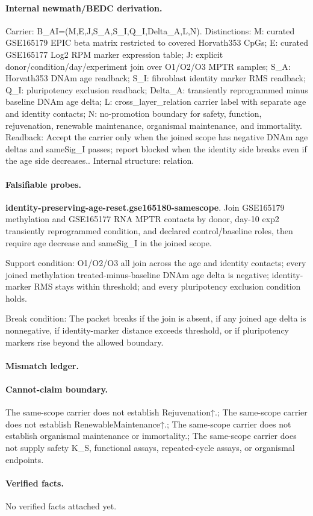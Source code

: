 \paragraph{Internal newmath/BEDC derivation.} Carrier: B\_AI=(M,E,J,S\_A,S\_I,Q\_I,Delta\_A,L,N). Distinctions: M: curated GSE165179 EPIC beta matrix restricted to covered Horvath353 CpGs; E: curated GSE165177 Log2 RPM marker expression table; J: explicit donor/condition/day/experiment join over O1/O2/O3 MPTR samples; S\_A: Horvath353 DNAm age readback; S\_I: fibroblast identity marker RMS readback; Q\_I: pluripotency exclusion readback; Delta\_A: transiently reprogrammed minus baseline DNAm age delta; L: cross\_layer\_relation carrier label with separate age and identity contacts; N: no-promotion boundary for safety, function, rejuvenation, renewable maintenance, organismal maintenance, and immortality. Readback: Accept the carrier only when the joined scope has negative DNAm age deltas and sameSig\_I passes; report blocked when the identity side breaks even if the age side decreases.. Internal structure: relation.

\paragraph{Falsifiable probes.}
\textbf{identity-preserving-age-reset.gse165180-samescope}. Join GSE165179 methylation and GSE165177 RNA MPTR contacts by donor, day-10 exp2 transiently reprogrammed condition, and declared control/baseline roles, then require age decrease and sameSig\_I in the joined scope.

Support condition: O1/O2/O3 all join across the age and identity contacts; every joined methylation treated-minus-baseline DNAm age delta is negative; identity-marker RMS stays within threshold; and every pluripotency exclusion condition holds.

Break condition: The packet breaks if the join is absent, if any joined age delta is nonnegative, if identity-marker distance exceeds threshold, or if pluripotency markers rise beyond the allowed boundary.

\paragraph{Mismatch ledger.}
\paragraph{Cannot-claim boundary.} The same-scope carrier does not establish Rejuvenation↑.; The same-scope carrier does not establish RenewableMaintenance↑.; The same-scope carrier does not establish organismal maintenance or immortality.; The same-scope carrier does not supply safety K\_S, functional assays, repeated-cycle assays, or organismal endpoints.

\paragraph{Verified facts.}
No verified facts attached yet.

